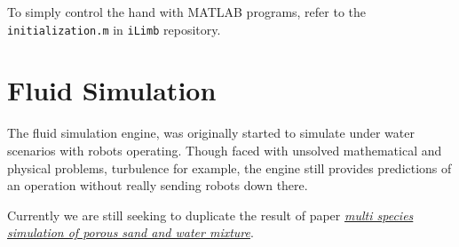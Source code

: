 \documentclass[11pt]{article}
\begin{document}
To simply control the hand with MATLAB programs, refer to the \texttt{initialization.m} in \texttt{iLimb} repository.


\section{Fluid Simulation}
\label{sec:orgheadline6}
The fluid simulation engine, was originally started to simulate under water scenarios with robots operating. Though faced with unsolved mathematical and physical problems, turbulence for example, the engine still provides predictions of an operation without really sending robots down there. 

Currently we are still seeking to duplicate the result of paper \href{https://www.math.ucla.edu/~jteran/papers/PGKFTJM17.pdf}{\emph{multi species simulation of porous sand and water mixture}}.
\end{document}
